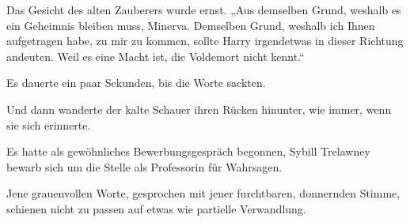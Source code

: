 Das Gesicht des alten Zauberers wurde ernst.
„Aus demselben Grund, weshalb es ein Geheimnis bleiben muss, Minerva. Demselben Grund, weshalb ich Ihnen aufgetragen habe, zu mir zu kommen, sollte Harry irgendetwas in dieser Richtung andeuten. Weil es eine Macht ist, die Voldemort nicht kennt.“

Es dauerte ein paar Sekunden, bis die Worte sackten.

Und dann wanderte der kalte Schauer ihren Rücken hinunter, wie immer, wenn sie sich erinnerte.

Es hatte als gewöhnliches Bewerbungsgespräch begonnen, Sybill Trelawney bewarb sich um die Stelle als Professorin für Wahrsagen.


Jene grauenvollen Worte, gesprochen mit jener furchtbaren, donnernden Stimme, schienen nicht zu passen auf etwas wie partielle Verwandlung.

